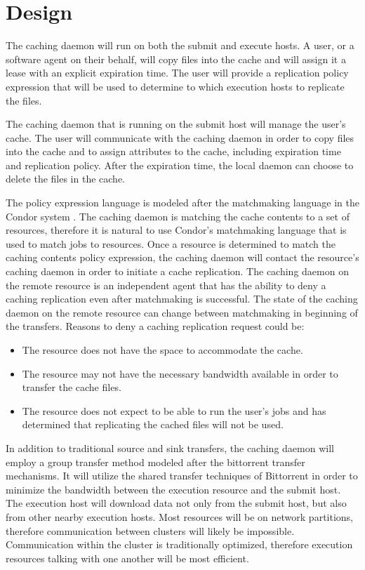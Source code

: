 \section{Design}

The caching daemon will run on both the submit and execute hosts.  A user, or a software agent on their behalf, will copy files into the cache and will assign it a lease with an explicit expiration time.  The user will provide a replication policy expression that will be used to determine to which execution hosts to replicate the files.

The caching daemon that is running on the submit host will manage the user's cache.  The user will communicate with the caching daemon in order to copy files into the cache and to assign attributes to the cache, including expiration time and replication policy.  After the expiration time, the local daemon can choose to delete the files in the cache.

The policy expression language is modeled after the matchmaking language in the Condor system \cite{raman1998matchmaking}.  The caching daemon is matching the cache contents to a set of resources, therefore it is natural to use Condor's matchmaking language that is used to match jobs to resources.  Once a resource is determined to match the caching contents policy expression, the caching daemon will contact the resource's caching daemon in order to initiate a cache replication.  The caching daemon on the remote resource is an independent agent that has the ability to deny a caching replication even after matchmaking is successful.  The state of the caching daemon on the remote resource can change between matchmaking in beginning of the transfers.  Reasons to deny a caching replication request could be:

\begin{itemize}
\item The resource does not have the space to accommodate the cache.
\item The resource may not have the necessary bandwidth available in order to transfer the cache files.
\item The resource does not expect to be able to run the user's jobs and has determined that replicating the cached files will not be used.
\end{itemize}

In addition to traditional source and sink transfers, the caching daemon will employ a group transfer method modeled after the bittorrent \cite{cohen2008bittorrent} transfer mechanisms.  It will utilize the shared transfer techniques of Bittorrent in order to minimize the bandwidth between the execution resource and the submit host.  The execution host will download data not only from the submit host, but also from other nearby execution hosts.  Most resources will be on network partitions, therefore communication between clusters will likely be impossible.  Communication within the cluster is traditionally optimized, therefore execution resources talking with one another will be most efficient.

